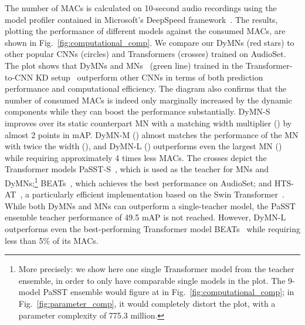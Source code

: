 \documentclass[lettersize,journal]{IEEEtran}
\begin{document}
The number of MACs is calculated on 10-second audio recordings using the model profiler contained in Microsoft's DeepSpeed framework~\cite{rasley2020deepspeed}. The results, plotting the performance of different models against the consumed MACs, are shown in Fig.~\ref{fig:computational_comp}. We compare our DyMNs (red stars) to other popular CNNs (circles) and Transformers (crosses) trained on AudioSet.
The plot shows that DyMNs and MNs~\cite{Schmid22Efficient} (green line) trained in the Transformer-to-CNN KD setup~\cite{Schmid22Efficient} outperform other CNNs in terms of both prediction performance and computational efficiency. The diagram also confirms that the number of consumed MACs is indeed only marginally increased by the dynamic components  while they can boost the performance substantially. DyMN-S improves over its static counterpart MN with a matching width multiplier () by almost 2 points in mAP. DyMN-M () almost matches the performance of the MN with twice the width (), and DyMN-L () outperforms even the largest MN () while requiring approximately 4 times less MACs. The crosses depict the Transformer models PaSST-S~\cite{Koutini21Passt}, which is used as the teacher for MNs and DyMNs;\footnote{More precisely: we show here one single Transformer model from the teacher ensemble, in order to only have comparable single models in the plot. The 9-model PaSST ensemble would figure at  in Fig.~\ref{fig:computational_comp}; in Fig.~\ref{fig:parameter_comp}, it would completely distort the plot, with a parameter complexity of 775.3 million.} BEATs~\cite{chen2022beats}, which achieves the best performance on AudioSet; and HTS-AT~\cite{Chen22HTS-AT}, a particularly efficient implementation based on the Swin Transformer~\cite{liu2021swin}. While both DyMNs and MNs can outperform a single-teacher model, the PaSST ensemble teacher performance of 49.5 mAP is not reached. However, DyMN-L outperforms even the best-performing Transformer model BEATs~\cite{chen2022beats} while requiring less than 5\% of its MACs.
\end{document}
